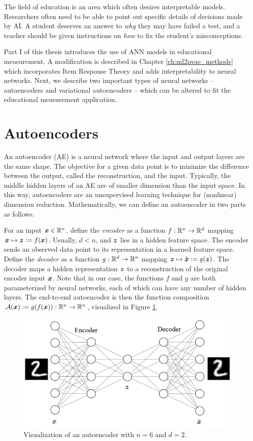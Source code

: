 The field of education is an area which often desires interpretable models. Researchers often need to be able to point out specific details of decisions made by AI. A student deserves an answer to \textit{why} they may have failed a test, and a teacher should be given instructions on \textit{how} to fix the student's misconceptions. 

Part I of this thesis introduces the use of ANN models in educational measurement. A modification is described in Chapter \ref{ch:ml2pvae_methods} which incorporates Item Response Theory and adds interpretability to neural networks. Next, we describe two important types of neural networks -- autoencoders and variational autoencoders -- which can be altered to fit the educational measurement application.

\section{Autoencoders}
An autoencoder (AE) is a neural network where the input and output layers are the same shape. The objective for a given data point is to minimize the difference between the output, called the reconstruction, and the input. Typically, the middle hidden layers of an AE are of smaller dimension than the input space. In this way, autoencoders are an unsupervised learning technique for (nonlinear) dimension reduction. Mathematically, we can define an autoencoder in two parts as follows.

For an input $\boldsymbol{x} \in \mathbb{R}^n$, define the \textit{encoder} as a function $f: \mathbb{R}^n \to \mathbb{R}^d$ mapping $\boldsymbol{x} \mapsto \boldsymbol{z} := f(\boldsymbol{x})$. Usually, $d < n$, and $\boldsymbol{z}$ lies in a hidden feature space. The encoder sends an observed data point to its representation in a learned feature space. Define the \textit{decoder} as a function $g: \mathbb{R}^d \to \mathbb{R}^n$ mapping $\boldsymbol{z} \mapsto \hat{\boldsymbol{x}} := g(\boldsymbol{z})$. The decoder maps a hidden representation $\boldsymbol{z}$ to a reconstruction of the original encoder input $\boldsymbol{x}$. Note that in our case, the functions $f$ and $g$ are both parameterized by neural networks, each of which can have any number of hidden layers. The end-to-end autoencoder is then the function composition $\mathcal{A}(\boldsymbol{x}):= g(f(\boldsymbol{x})): \mathbb{R}^n \to \mathbb{R}^n$, visualized in Figure \ref{fig:ae_visual}.
\begin{figure}[h]
  \centering
  \includegraphics[width=.8\textwidth]{img/ae_visual.png}
  \caption{Visualization of an autoencoder with $n=6$ and $d=2$.}
  \label{fig:ae_visual}
\end{figure}

